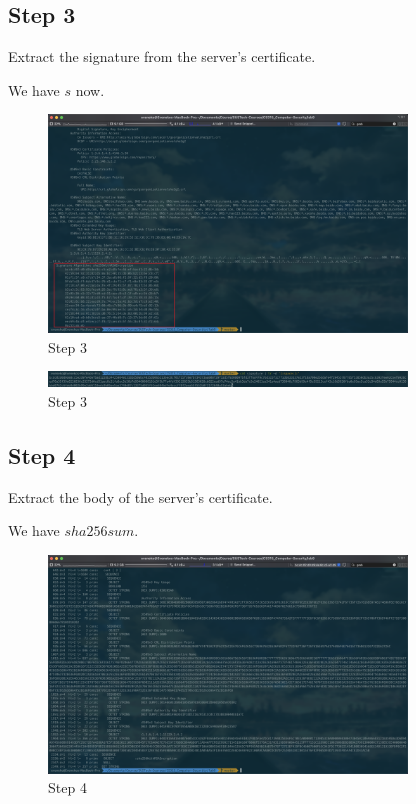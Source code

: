 \documentclass[onecolumn,oneside]{SUSTechHomework}
\begin{document}
  \subsection*{Step 3}

  Extract the signature from the server’s certificate.

  We have $s$ now.

  \begin{figure}[H]
    \centering
    \includegraphics[width=0.85\textwidth]{img/task6_5.png}
    \caption{Step 3}
  \end{figure}

  \begin{figure}[H]
    \centering
    \includegraphics[width=0.85\textwidth]{img/task6_6.png}
    \caption{Step 3}
  \end{figure}

  \subsection*{Step 4}

  Extract the body of the server’s certificate.

  We have $sha256sum$.

  \begin{figure}[H]
    \centering
    \includegraphics[width=0.85\textwidth]{img/task6_7.png}
    \caption{Step 4}
  \end{figure}
\end{document}
